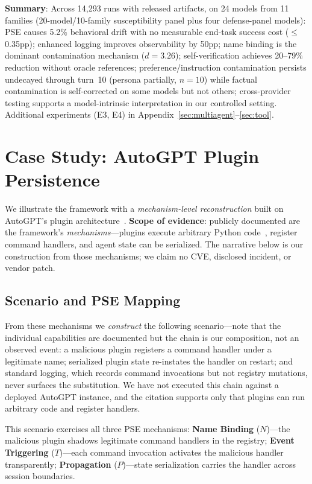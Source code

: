 \documentclass{article}
\theoremstyle{plain}
\theoremstyle{definition}
\newcommand{\pse}{\textsc{PSE}}
\begin{document}
\textbf{Summary}: Across 14,293 runs with released artifacts, on 24 models from 11 families (20-model/10-family susceptibility panel plus four defense-panel models): PSE causes 5.2\% behavioral drift with no measurable end-task success cost ($\leq$0.35pp); enhanced logging improves observability by 50pp; name binding is the dominant contamination mechanism ($d=3.26$); self-verification achieves 20--79\% reduction without oracle references; preference/instruction contamination persists undecayed through turn~10 (persona partially, $n{=}10$) while factual contamination is self-corrected on some models but not others; cross-provider testing supports a model-intrinsic interpretation in our controlled setting. Additional experiments (E3, E4) in Appendix~\ref{sec:multiagent}--\ref{sec:tool}.

\section{Case Study: AutoGPT Plugin Persistence}
\label{sec:case-study}

We illustrate the framework with a \emph{mechanism-level reconstruction} built on AutoGPT's plugin architecture~\cite{autogpt2023,autogptplugins2023}. \textbf{Scope of evidence}: publicly documented are the framework's \emph{mechanisms}---plugins execute arbitrary Python code~\cite{autogptplugins2023}, register command handlers, and agent state can be serialized. The narrative below is our construction from those mechanisms; we claim no CVE, disclosed incident, or vendor patch.

\subsection{Scenario and PSE Mapping}

From these mechanisms we \emph{construct} the following scenario---note that the individual capabilities are documented but the chain is our composition, not an observed event: a malicious plugin registers a command handler under a legitimate name; serialized plugin state re-instates the handler on restart; and standard logging, which records command invocations but not registry mutations, never surfaces the substitution. We have not executed this chain against a deployed AutoGPT instance, and the citation supports only that plugins can run arbitrary code and register handlers.

This scenario exercises all three \pse{} mechanisms: \textbf{Name Binding} ($N$)---the malicious plugin shadows legitimate command handlers in the registry; \textbf{Event Triggering} ($T$)---each command invocation activates the malicious handler transparently; \textbf{Propagation} ($P$)---state serialization carries the handler across session boundaries.
\end{document}
